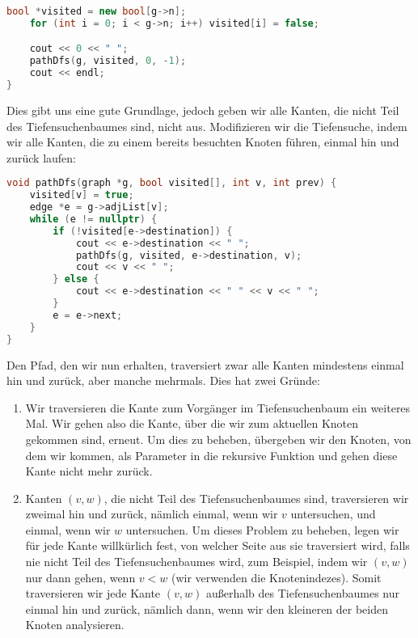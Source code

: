 \documentclass[11pt,a4paper]{article}
\begin{document}
\begin{loesung}
\begin{enumerate}
\begin{lstlisting}[language=c++]
    bool *visited = new bool[g->n];
    for (int i = 0; i < g->n; i++) visited[i] = false;

    cout << 0 << " ";
    pathDfs(g, visited, 0, -1);
    cout << endl;
}
        \end{lstlisting}
        Dies gibt uns eine gute Grundlage, jedoch geben wir alle Kanten, die nicht Teil des Tiefensuchenbaumes sind, nicht aus.
        Modifizieren wir die Tiefensuche, indem wir alle Kanten, die zu einem bereits besuchten Knoten führen, einmal hin und zurück laufen:
        \begin{lstlisting}[language=c++]
void pathDfs(graph *g, bool visited[], int v, int prev) {
    visited[v] = true;
    edge *e = g->adjList[v];
    while (e != nullptr) {
        if (!visited[e->destination]) {
            cout << e->destination << " ";
            pathDfs(g, visited, e->destination, v);
            cout << v << " ";
        } else {
            cout << e->destination << " " << v << " ";
        }
        e = e->next;
    }
}
        \end{lstlisting}
        Den Pfad, den wir nun erhalten, traversiert zwar alle Kanten mindestens einmal hin und zurück, aber manche mehrmals.
        Dies hat zwei Gründe:
        \begin{enumerate}[label=\arabic*.]
            \item Wir traversieren die Kante zum Vorgänger im Tiefensuchenbaum ein weiteres Mal.
            Wir gehen also die Kante, über die wir zum aktuellen Knoten gekommen sind, erneut.
            Um dies zu beheben, übergeben wir den Knoten, von dem wir kommen, als Parameter in die rekursive Funktion und gehen diese Kante nicht mehr zurück.
            \item 
            Kanten $(v, w)$, die nicht Teil des Tiefensuchenbaumes sind, traversieren wir zweimal hin und zurück, nämlich einmal, wenn wir $v$ untersuchen, und einmal, wenn wir $w$ untersuchen.
            Um dieses Problem zu beheben, legen wir für jede Kante willkürlich fest, von welcher Seite aus sie traversiert wird, falls nie nicht Teil des Tiefensuchenbaumes wird, zum Beispiel, indem wir $(v, w)$ nur dann gehen, wenn $v < w$ (wir verwenden die Knotenindezes).
            Somit traversieren wir jede Kante $(v, w)$ außerhalb des Tiefensuchenbaumes nur einmal hin und zurück, nämlich dann, wenn wir den kleineren der beiden Knoten analysieren.
        \end{enumerate}

\end{enumerate}
\end{loesung}
\end{document}
